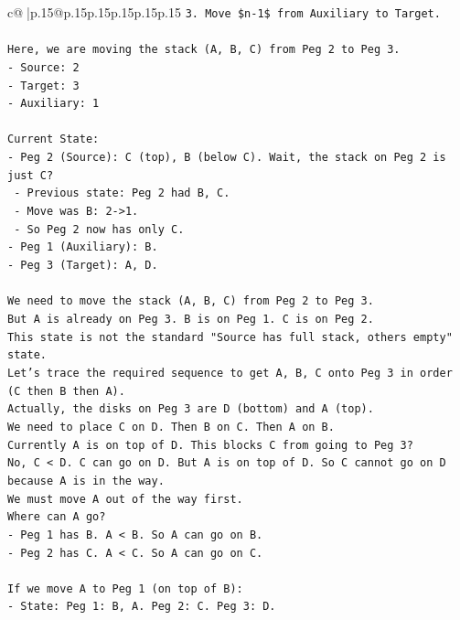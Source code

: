 \documentclass{article}
\begin{document}
{\begin{supertabular}{c@{$\;$}|p{.15\linewidth}@{}p{.15\linewidth}p{.15\linewidth}p{.15\linewidth}p{.15\linewidth}p{.15\linewidth}}
{{{\texttt{3. Move \$n{-}1\$ from Auxiliary to Target.} \\
\\ 
\texttt{Here, we are moving the stack (A, B, C) from Peg 2 to Peg 3.} \\
\texttt{{-} Source: 2} \\
\texttt{{-} Target: 3} \\
\texttt{{-} Auxiliary: 1} \\
\\ 
\texttt{Current State:} \\
\texttt{{-} Peg 2 (Source): C (top), B (below C). Wait, the stack on Peg 2 is just C?} \\
\texttt{  {-} Previous state: Peg 2 had B, C.} \\
\texttt{  {-} Move was B: 2{-}>1.} \\
\texttt{  {-} So Peg 2 now has only C.} \\
\texttt{{-} Peg 1 (Auxiliary): B.} \\
\texttt{{-} Peg 3 (Target): A, D.} \\
\\ 
\texttt{We need to move the stack (A, B, C) from Peg 2 to Peg 3.} \\
\texttt{But A is already on Peg 3. B is on Peg 1. C is on Peg 2.} \\
\texttt{This state is not the standard "Source has full stack, others empty" state.} \\
\texttt{Let's trace the required sequence to get A, B, C onto Peg 3 in order (C then B then A).} \\
\texttt{Actually, the disks on Peg 3 are D (bottom) and A (top).} \\
\texttt{We need to place C on D. Then B on C. Then A on B.} \\
\texttt{Currently A is on top of D. This blocks C from going to Peg 3?} \\
\texttt{No, C < D. C can go on D. But A is on top of D. So C cannot go on D because A is in the way.} \\
\texttt{We must move A out of the way first.} \\
\texttt{Where can A go?} \\
\texttt{{-} Peg 1 has B. A < B. So A can go on B.} \\
\texttt{{-} Peg 2 has C. A < C. So A can go on C.} \\
\\ 
\texttt{If we move A to Peg 1 (on top of B):} \\
\texttt{{-} State: Peg 1: B, A. Peg 2: C. Peg 3: D.} \\
}}}
\end{supertabular}}
\end{document}
